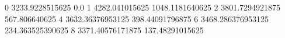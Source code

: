 0 3233.9228515625 0.0
1 4282.041015625 1048.1181640625
2 3801.7294921875 567.806640625
4 3632.36376953125 398.44091796875
6 3468.286376953125 234.363525390625
8 3371.40576171875 137.48291015625
